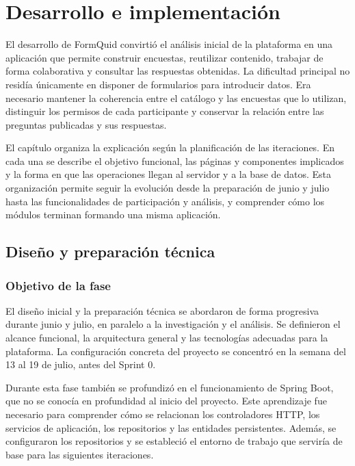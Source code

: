\documentclass[11pt,a4paper]{report}
\begin{document}
\chapter{Desarrollo e implementación}
\label{chap:desarrollo-implementacion}

El desarrollo de FormQuid convirtió el análisis inicial de la plataforma en una aplicación que permite construir encuestas, reutilizar contenido, trabajar de forma colaborativa y consultar las respuestas obtenidas. La dificultad principal no residía únicamente en disponer de formularios para introducir datos. Era necesario mantener la coherencia entre el catálogo y las encuestas que lo utilizan, distinguir los permisos de cada participante y conservar la relación entre las preguntas publicadas y sus respuestas.

El capítulo organiza la explicación según la planificación de las iteraciones. En cada una se describe el objetivo funcional, las páginas y componentes implicados y la forma en que las operaciones llegan al servidor y a la base de datos. Esta organización permite seguir la evolución desde la preparación de junio y julio hasta las funcionalidades de participación y análisis, y comprender cómo los módulos terminan formando una misma aplicación.

\section{Diseño y preparación técnica}
\subsection{Objetivo de la fase}

El diseño inicial y la preparación técnica se abordaron de forma progresiva durante junio y julio, en paralelo a la investigación y el análisis. Se definieron el alcance funcional, la arquitectura general y las tecnologías adecuadas para la plataforma. La configuración concreta del proyecto se concentró en la semana del 13 al 19 de julio, antes del Sprint 0.

Durante esta fase también se profundizó en el funcionamiento de Spring Boot, que no se conocía en profundidad al inicio del proyecto. Este aprendizaje fue necesario para comprender cómo se relacionan los controladores HTTP, los servicios de aplicación, los repositorios y las entidades persistentes. Además, se configuraron los repositorios y se estableció el entorno de trabajo que serviría de base para las siguientes iteraciones.
\end{document}
